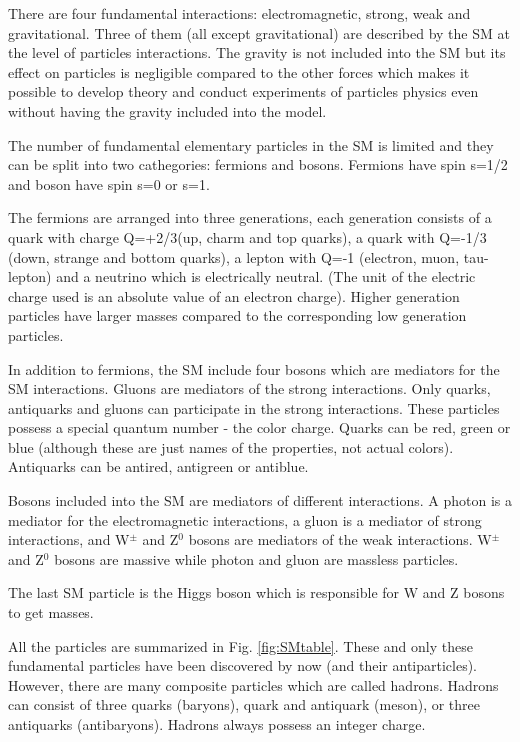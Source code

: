 There are four fundamental interactions: electromagnetic, strong, weak and gravitational. Three of them (all except gravitational) are described by the SM at the level of particles interactions. The gravity is not included into the SM but its effect on particles is negligible compared to the other forces which makes it possible to develop theory and conduct experiments of particles physics even without having the gravity included into the model. 

 The number of fundamental elementary particles in the SM is limited and they can be split into two cathegories: fermions and bosons. Fermions have spin s=1/2 and boson have spin s=0 or s=1. 

The fermions are arranged into three generations, each generation consists of a quark with charge Q=+2/3(up, charm and top quarks), a quark with Q=-1/3 (down, strange and bottom quarks), a lepton with Q=-1 (electron, muon, tau-lepton) and a neutrino which is electrically neutral. (The unit of the electric charge used is an absolute value of an electron charge). Higher generation particles have larger masses compared to the corresponding low generation particles. 

In addition to fermions, the SM include four bosons which are mediators for the SM interactions. Gluons are mediators of the strong interactions. Only quarks, antiquarks and gluons can participate in the strong interactions. These particles possess a special quantum number - the color charge. Quarks can be red, green or blue (although these are just names of the properties, not actual colors). Antiquarks can be antired, antigreen or antiblue. 

Bosons included into the SM are mediators of different interactions. A photon is a mediator for the electromagnetic interactions,  a gluon is a mediator of strong interactions, and W$^{\pm}$ and Z$^0$ bosons are mediators of the weak interactions. W$^{\pm}$ and Z$^0$ bosons are massive while photon and gluon are massless particles. 

The last SM particle is the Higgs boson which is responsible for W and Z bosons to get masses.

All the particles are summarized in Fig. \ref{fig:SMtable}. These and only these fundamental particles have been discovered by now (and their antiparticles). However, there are many composite particles which are called hadrons. Hadrons can consist of three quarks (baryons), quark and antiquark (meson), or three antiquarks (antibaryons). Hadrons always possess an integer charge.

